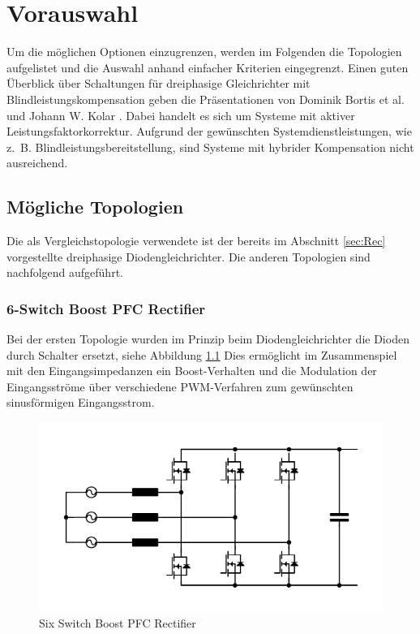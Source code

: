 \chapter{Vorauswahl}
Um die möglichen Optionen einzugrenzen, werden im Folgenden die Topologien aufgelistet und die Auswahl anhand einfacher Kriterien eingegrenzt. Einen guten Überblick über Schaltungen für dreiphasige Gleichrichter mit Blindleistungskompensation geben die Präsentationen von Dominik Bortis et al. \cite{Advanced3PhPFC} und Johann W. Kolar \cite{Essenceof3pKolar}. Dabei handelt es sich um Systeme mit aktiver Leistungsfaktorkorrektur. Aufgrund der gewünschten Systemdienstleistungen, wie z.~B. Blindleistungsbereitstellung, sind Systeme mit hybrider Kompensation nicht ausreichend.

\section{Mögliche Topologien}
Die als Vergleichstopologie verwendete ist der bereits im Abschnitt \ref{sec:Rec} vorgestellte dreiphasige Diodengleichrichter. Die anderen Topologien sind nachfolgend aufgeführt.
	\subsection{6-Switch Boost PFC Rectifier}
				Bei der ersten Topologie wurden im Prinzip beim Diodengleichrichter die Dioden durch Schalter ersetzt, siehe Abbildung \ref{fig:sixswitchboost} Dies ermöglicht im Zusammenspiel mit den Eingangsimpedanzen ein Boost-Verhalten und die Modulation der Eingangsströme über verschiedene \gls{PWM}-Verfahren zum gewünschten sinusförmigen Eingangsstrom.
			\begin{figure} 
				\centering
				\includegraphics[width=1\linewidth]{content/Grafiken/SixSwitchBoost}
				\caption{Six Switch Boost PFC Rectifier}
				\label{fig:sixswitchboost}
			\end{figure}
		
